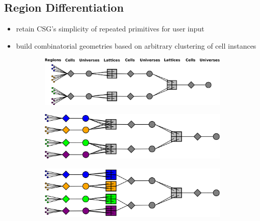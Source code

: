 \subsection{Region Differentiation}
\label{sec:chap3-region-diff}

\begin{itemize}[noitemsep]
  \item retain CSG's simplicity of repeated primitives for user input
  \item build combinatorial geometries based on arbitrary clustering of cell instances
\end{itemize}


\newpage
\begin{figure}[h!]
\begin{subfigure}{\textwidth}
  \centering
  \includegraphics[width=0.82\linewidth]{figures/workflow/opencg/region-differentiation-1}
  \caption{}
  \label{fig:differentation-1}
\end{subfigure}
\begin{subfigure}{\textwidth}
  \centering
  \includegraphics[width=0.75\linewidth]{figures/workflow/opencg/region-differentiation-2}
  \caption{}
  \label{fig:differentation-2}
\end{subfigure}
\begin{subfigure}{\textwidth}
  \centering
  \includegraphics[width=0.75\linewidth]{figures/workflow/opencg/region-differentiation-3}
  \caption{}
  \label{fig:differentation-3}
\end{subfigure}
\begin{subfigure}{\textwidth}

\end{subfigure}
\end{figure}
